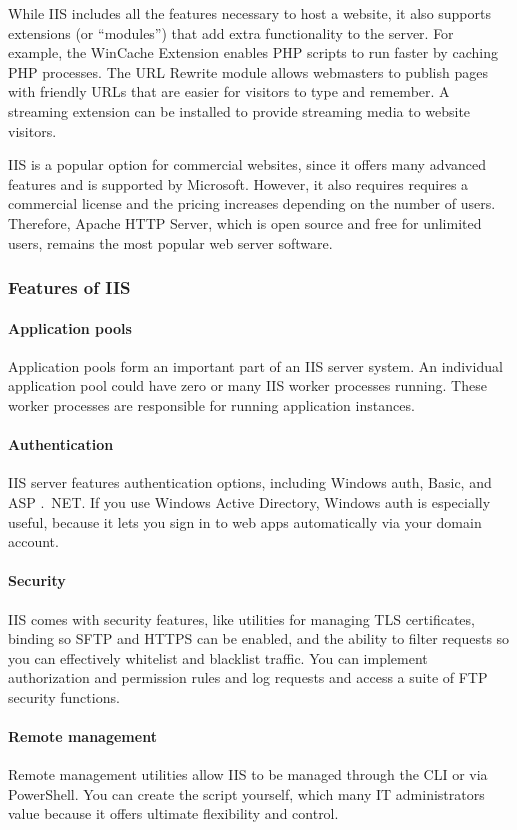 While IIS includes all the features necessary to host a website, it also supports extensions (or “modules”) that add extra functionality to the server. For example, the WinCache Extension enables PHP scripts to run faster by caching PHP processes. The URL Rewrite module allows webmasters to publish pages with friendly URLs that are easier for visitors to type and remember. A streaming extension can be installed to provide streaming media to website visitors.

IIS is a popular option for commercial websites, since it offers many advanced features and is supported by Microsoft. However, it also requires requires a commercial license and the pricing increases depending on the number of users. Therefore, Apache HTTP Server, which is open source and free for unlimited users, remains the most popular web server software.

\subsubsection*{Features of IIS}

\paragraph*{Application pools}
 Application pools form an important part of an IIS server system. An individual application pool could have zero or many IIS worker processes running. These worker processes are responsible for running application instances.



\paragraph*{Authentication}
IIS server features authentication options, including Windows auth, Basic, and ASP .\ NET. If you use Windows Active Directory, Windows auth is especially useful, because it lets you sign in to web apps automatically via your domain account.

\paragraph*{Security}
IIS comes with security features, like utilities for managing TLS certificates, binding so SFTP and HTTPS can be enabled, and the ability to filter requests so you can effectively whitelist and blacklist traffic. You can implement authorization and permission rules and log requests and access a suite of FTP security functions.

\paragraph*{Remote management}
Remote management utilities allow IIS to be managed through the CLI or via PowerShell. You can create the script yourself, which many IT administrators value because it offers ultimate flexibility and control.

\newpage\thispagestyle{empty}